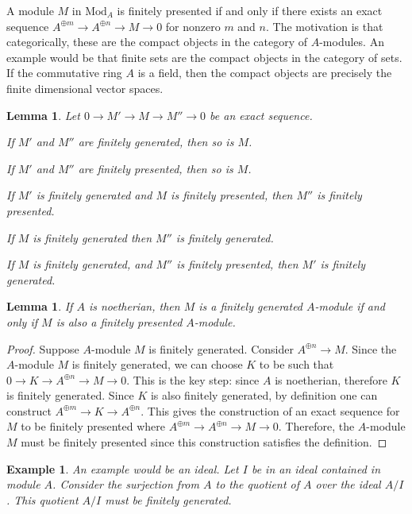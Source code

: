 \documentclass{tufte-book}
\newtheorem{lemma}[theorem]{Lemma}
\newtheorem{example}[theorem]{Example}
\begin{document}
A module $M$ in 
$\mathrm{Mod}_A$ is finitely presented
if and only if there exists an exact sequence
$A^{\oplus m} \rightarrow A^{\oplus n} \rightarrow M \rightarrow 0$
for nonzero $m$ and $n$. The motivation is that categorically, 
these are the compact objects in the category of $A$-modules.
An example would be that finite sets are the compact objects in the category of sets.
If the commutative ring $A$ is a field, then the compact objects
are precisely the finite dimensional vector spaces.

\begin{lemma}
	Let $0 \rightarrow M' \rightarrow M \rightarrow M'' \rightarrow 0$
	be an exact sequence.
	
	If $M'$ and $M''$ are finitely generated, then so is $M$.
	
	If $M'$ and $M''$ are finitely presented, then so is $M$.
	
	If $M'$ is finitely generated and $M$ is finitely presented, then $M''$ is finitely presented.
	
	If $M$ is finitely generated then $M''$ is finitely generated.
	
	If $M$ is finitely generated, and $M''$ is finitely presented, then $M'$ is finitely generated.
\end{lemma}

\begin{lemma}
	If $A$ is noetherian, then $M$ is a finitely generated $A$-module if and only if $M$ is also a finitely presented $A$-module.
\end{lemma}

\begin{proof}
	Suppose $A$-module $M$ is finitely generated. 
	Consider $A^{\oplus n} \rightarrow M$. 
	Since the $A$-module $M$ is finitely generated, we 
	can choose $K$ to be such that
	$0 \rightarrow K \rightarrow A^{\oplus n} \rightarrow M \rightarrow 0$. 
	This is the key step: since $A$ is noetherian, therefore $K$ is finitely generated. 
	Since $K$ is also finitely generated, by definition one can construct 
	$A^{\oplus m} \rightarrow K \rightarrow A^{\oplus n}$.
	This gives the construction of an exact sequence 
	for $M$ to be finitely presented 
	where $A^{\oplus m} \rightarrow A^{\oplus n} \rightarrow M \rightarrow 0$.
	Therefore, the $A$-module $M$ must be finitely presented since this 
	construction satisfies the definition.
\end{proof}

\begin{example}
	An example would be an ideal. Let $I$ be in an ideal
contained in module $A$. Consider the surjection from $A$ to the 
quotient of $A$ over the ideal $A/I$. 
This quotient $A/I$ must be finitely generated.
\end{example}
\end{document}
